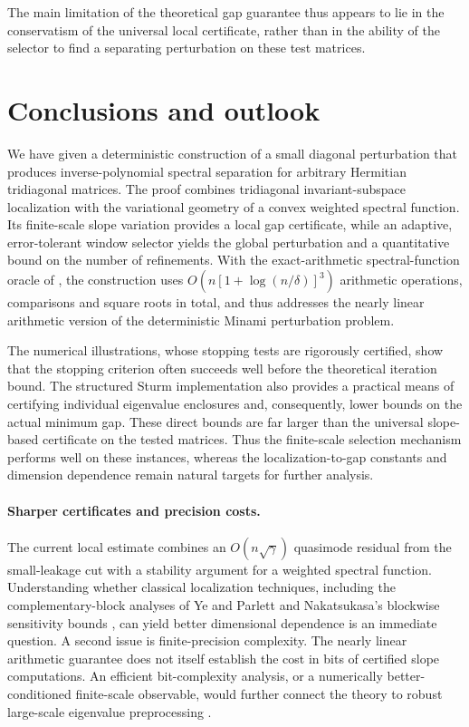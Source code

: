 \documentclass[10pt,a4paper]{article}
\begin{document}
The main limitation of the theoretical gap guarantee thus
appears to lie in the conservatism of the universal local
certificate, rather than in the ability of the selector
to find a separating perturbation on these test matrices.
 

\section{Conclusions and outlook}
\label{sec:conclusion}

We have given a deterministic construction of a small diagonal
perturbation that produces inverse-polynomial spectral separation for
arbitrary Hermitian tridiagonal matrices. The proof combines
tridiagonal invariant-subspace localization with the variational geometry
of a convex weighted spectral function. Its finite-scale slope variation
provides a local gap certificate, while an adaptive, error-tolerant window
selector yields the global perturbation and a quantitative bound on the
number of refinements. With the exact-arithmetic spectral-function oracle of
, the construction uses
$O(n[1+\log(n/\delta)]^3)$ arithmetic operations, comparisons and
square roots in total, and thus addresses the nearly linear
arithmetic version of the deterministic Minami perturbation problem.

The numerical illustrations, whose stopping tests are rigorously
certified, show that the stopping criterion often
succeeds well before the theoretical iteration bound. The structured
Sturm implementation also provides a practical means of certifying
individual eigenvalue enclosures and, consequently, lower bounds on the
actual minimum gap. These direct bounds are far larger than the
universal slope-based certificate on the tested matrices. Thus the
finite-scale selection mechanism performs well on these instances,
whereas the localization-to-gap constants and dimension dependence
remain natural targets for further analysis.

\paragraph{Sharper certificates and precision costs.}
The current local estimate combines an $O(n\sqrt\gamma)$
quasimode residual from the small-leakage cut with a stability
argument for a weighted spectral function. Understanding whether
classical localization techniques, including the complementary-block
analyses of Ye and Parlett and Nakatsukasa's blockwise sensitivity
bounds \cite{Ye1995,Parlett1996,VoemelParlett2011,Nakatsukasa2012},
can yield better dimensional dependence is an immediate question.
A second issue is finite-precision complexity. The nearly linear
arithmetic guarantee does not itself establish the cost in bits of
certified slope computations. An efficient bit-complexity analysis,
or a numerically better-conditioned finite-scale observable, would
further connect the theory to robust large-scale eigenvalue
preprocessing \cite{Sobczyk2025,GrafTownsend2026}.
\end{document}
